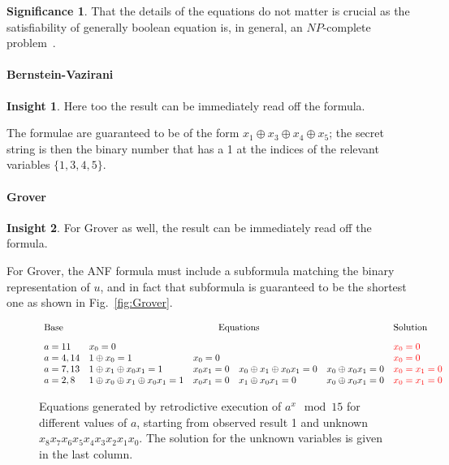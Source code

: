 \documentclass[sigplan,screen]{acmart}
\newcommand{\red}[1]{{\color{red}{#1}}}
\theoremstyle{definition}
\newtheorem*{insight}{Insight}
\newtheorem*{signif}{Significance}
\begin{document}
\begin{signif}
That the details of the equations do not matter is crucial as the
satisfiability of generally boolean equation is, in
general, an $\mathit{NP}$-complete
problem~\cite{4640789,Karp1972,10.1145/800157.805047}.
\end{signif}

\paragraph*{Bernstein-Vazirani}

\begin{insight}
  Here too the result can be immediately read off the formula.
\end{insight}

The formulae are guaranteed to be of the form
$x_1 \oplus x_3 \oplus x_4 \oplus x_5$; the secret string is then the
binary number that has a 1 at the indices of the relevant variables
$\{ 1,3,4,5 \}$.

\paragraph*{Grover}

\begin{insight}
  For Grover as well, the result can be immediately read off the formula.
\end{insight}

For Grover, the ANF formula must include a
subformula matching the binary representation of $u$, and in fact that
subformula is guaranteed to be the shortest one as shown in Fig.~\ref{fig:Grover}.

\begin{figure}
\[\begin{array}{l@{\quad}lllll}
\textrm{Base} & \multicolumn{4}{c}{\textrm{Equations}} & \textrm{Solution} \\[2ex]
a=11 & x_0 = 0 &&&& \red{x_0 = 0} \\
a=4,14 & 1 \oplus x_0 = 1 & x_0 = 0 &&
  & \red{x_0 = 0} \\
a=7,13 & 1 \oplus x_1 \oplus x_0x_1 = 1 & x_0x_1 = 0 & x_0 \oplus x_1 \oplus x_0x_1 = 0 &  x_0 \oplus x_0x_1 = 0 & \red{x_0=x_1=0} \\
a=2,8 & 1 \oplus x_0 \oplus x_1 \oplus x_0x_1 = 1 & x_0x_1 = 0 & x_1 \oplus x_0x_1 = 0 & x_0 \oplus x_0x_1 = 0  & \red{x_0=x_1=0}
\end{array}\]
\caption{\label{fig:shor-eqs}Equations generated by retrodictive
  execution of $a^x \mod{15}$ for different values of $a$, starting
  from observed result 1 and unknown
  $x_8x_7x_6x_5x_4x_3x_2x_1x_0$. The solution for the unknown
  variables is given in the last column.}
\end{figure}
\end{document}
